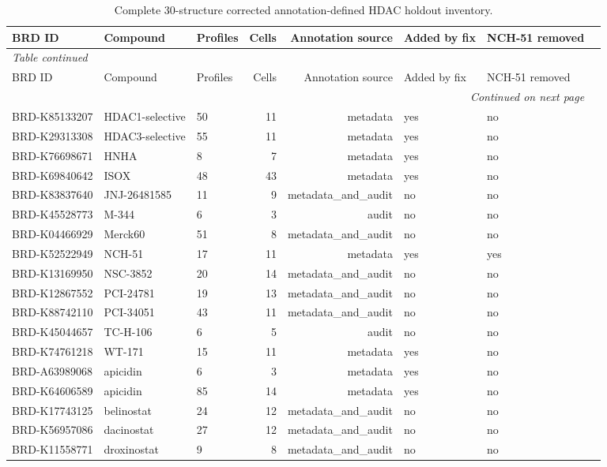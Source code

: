 \begingroup
\footnotesize
\begin{longtable}{@{}lllrrlll@{}}
\caption{Complete 30-structure corrected annotation-defined HDAC holdout inventory.}\label{tab:s_hdac30}\\
\toprule
BRD ID & Compound & Profiles & Cells & Annotation source & Added by fix & NCH-51 removed \\
\midrule
\endfirsthead
\multicolumn{7}{l}{\textit{Table continued}}\\
\toprule
BRD ID & Compound & Profiles & Cells & Annotation source & Added by fix & NCH-51 removed \\
\midrule
\endhead
\midrule
\multicolumn{7}{r}{\textit{Continued on next page}}\\
\endfoot
\bottomrule
\endlastfoot
BRD-K85133207 & HDAC1-selective & 50 & 11 & metadata & yes & no \\
BRD-K29313308 & HDAC3-selective & 55 & 11 & metadata & yes & no \\
BRD-K76698671 & HNHA & 8 & 7 & metadata & yes & no \\
BRD-K69840642 & ISOX & 48 & 43 & metadata & yes & no \\
BRD-K83837640 & JNJ-26481585 & 11 & 9 & metadata\_and\_audit & no & no \\
BRD-K45528773 & M-344 & 6 & 3 & audit & no & no \\
BRD-K04466929 & Merck60 & 51 & 8 & metadata\_and\_audit & no & no \\
BRD-K52522949 & NCH-51 & 17 & 11 & metadata & yes & yes \\
BRD-K13169950 & NSC-3852 & 20 & 14 & metadata\_and\_audit & no & no \\
BRD-K12867552 & PCI-24781 & 19 & 13 & metadata\_and\_audit & no & no \\
BRD-K88742110 & PCI-34051 & 43 & 11 & metadata\_and\_audit & no & no \\
BRD-K45044657 & TC-H-106 & 6 & 5 & audit & no & no \\
BRD-K74761218 & WT-171 & 15 & 11 & metadata & yes & no \\
BRD-A63989068 & apicidin & 6 & 3 & metadata & yes & no \\
BRD-K64606589 & apicidin & 85 & 14 & metadata & yes & no \\
BRD-K17743125 & belinostat & 24 & 12 & metadata\_and\_audit & no & no \\
BRD-K56957086 & dacinostat & 27 & 12 & metadata\_and\_audit & no & no \\
BRD-K11558771 & droxinostat & 9 & 8 & metadata\_and\_audit & no & no \\

\end{longtable}
